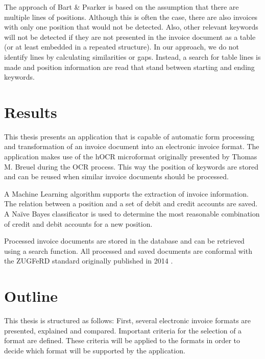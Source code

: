 The approach of Bart \& Psarker \cite{Bart10} is based on the assumption that there are multiple lines of positions. Although this is often the case, there are also invoices with only one position that would not be detected. Also, other relevant keywords will not be detected if they are not presented in the invoice document as a table (or at least embedded in a repeated structure).
In our approach, we do not identify lines by calculating similarities or gaps. Instead, a search for table lines is made and position information are read that stand between starting and ending keywords.


\section{Results}
\label{sec1.5}
This thesis presents an application that is capable of automatic form processing and transformation of an invoice document into an electronic invoice format. The application makes use of the hOCR microformat originally presented by Thomas M. Breuel \cite{Breuel07} during the OCR process. This way the position of keywords are stored and can be reused when similar invoice documents should be processed.

A Machine Learning algorithm supports the extraction of invoice information. The relation between a position and a set of debit and credit accounts are saved. A Na{\"i}ve Bayes classificator is used to determine the most reasonable combination of credit and debit accounts for a new position.

Processed invoice documents are stored in the database and can be retrieved using a search function. All processed and saved documents are conformal with the ZUGFeRD standard originally published in 2014 \cite{Ferd14}.

\section{Outline}
\label{sec1.6}

This thesis is structured as follows: First, several electronic invoice formats are presented, explained and compared. Important criteria for the selection of a format are defined. These criteria will be applied to the formats in order to decide which format will be supported by the application.

